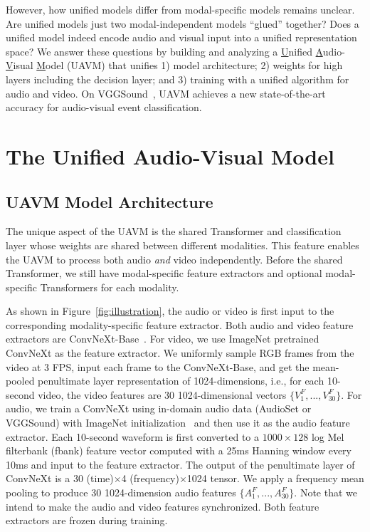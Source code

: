 \documentclass[journal]{IEEEtran}
\newcommand{\rev}[1]{{\color{dblue} #1}}
\begin{document}
\rev{However, how unified models differ from modal-specific models remains unclear. Are unified models just two modal-independent models ``glued'' together? Does a unified model indeed encode audio and visual input into a unified representation space? We answer these questions by building and analyzing a \underline{U}nified \underline{A}udio-\underline{V}isual \underline{M}odel (UAVM) that unifies 1) model architecture; 2) weights for high layers including the decision layer; and 3) training with a unified algorithm for audio and video. On VGGSound~\cite{chen2020vggsound}, UAVM achieves a new state-of-the-art accuracy for audio-visual event classification.}

\section{The Unified Audio-Visual Model}
\subsection{UAVM Model Architecture}
\label{sec:mdl_arc}

The unique aspect of the UAVM is the shared Transformer and classification layer whose weights are shared between different modalities.  This feature enables the UAVM to process both audio \emph{and} video independently. Before the shared Transformer, we still have modal-specific feature extractors and optional modal-specific Transformers for each modality.

As shown in Figure~\ref{fig:illustration}, the audio or video is first input to the corresponding modality-specific feature extractor. Both audio and video feature extractors are ConvNeXt-Base~\cite{liu2022convnet}. For video, we use ImageNet pretrained ConvNeXt as the feature extractor. We uniformly sample RGB frames from the video at 3 FPS, input each frame to the ConvNeXt-Base, and get the mean-pooled penultimate layer representation of 1024-dimensions, i.e., for each 10-second video, the video features are 30 1024-dimensional vectors $\{V^{F}_{1}, ..., V^{F}_{30}\}$. For audio, we train a ConvNeXt using in-domain audio data (AudioSet or VGGSound) with ImageNet initialization~\cite{gong_psla} and then use it as the audio feature extractor. Each 10-second waveform is first converted to a $1000\times128$ log Mel filterbank (fbank) feature vector computed with a 25ms Hanning window every 10ms and input to the feature extractor. The output of the penultimate layer of ConvNeXt is a 30 (time)$\times$4 (frequency)$\times$1024 tensor. We apply a frequency mean pooling to produce 30 1024-dimension audio features $\{A^{F}_{1}, ..., A^{F}_{30}\}$. Note that we intend to make the audio and video features synchronized. Both feature extractors are frozen during training. 
\end{document}
